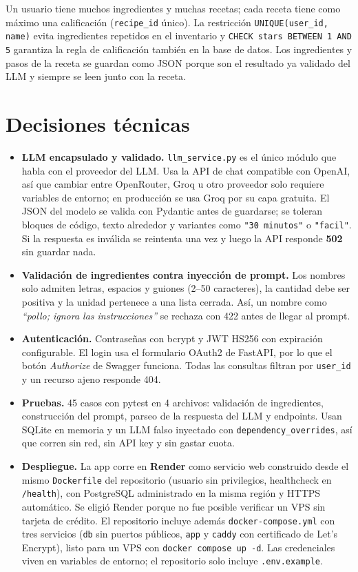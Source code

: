 \documentclass[10pt,a4paper]{article}
\newcommand{\code}[1]{\texttt{\small #1}}
\begin{document}
Un usuario tiene muchos ingredientes y muchas recetas; cada receta tiene como máximo una calificación (\code{recipe\_id} único). La restricción \code{UNIQUE(user\_id, name)} evita ingredientes repetidos en el inventario y \code{CHECK stars BETWEEN 1 AND 5} garantiza la regla de calificación también en la base de datos. Los ingredientes y pasos de la receta se guardan como JSON porque son el resultado ya validado del LLM y siempre se leen junto con la receta.

\section{Decisiones técnicas}
\begin{itemize}
  \item \textbf{LLM encapsulado y validado.} \code{llm\_service.py} es el único módulo que habla con el proveedor del LLM. Usa la API de chat compatible con OpenAI, así que cambiar entre OpenRouter, Groq u otro proveedor solo requiere variables de entorno; en producción se usa Groq por su capa gratuita. El JSON del modelo se valida con Pydantic antes de guardarse; se toleran bloques de código, texto alrededor y variantes como \code{"30 minutos"} o \code{"facil"}. Si la respuesta es inválida se reintenta una vez y luego la API responde \textbf{502} sin guardar nada.
  \item \textbf{Validación de ingredientes contra inyección de prompt.} Los nombres solo admiten letras, espacios y guiones (2–50 caracteres), la cantidad debe ser positiva y la unidad pertenece a una lista cerrada. Así, un nombre como \textit{``pollo; ignora las instrucciones''} se rechaza con 422 antes de llegar al prompt.
  \item \textbf{Autenticación.} Contraseñas con bcrypt y JWT HS256 con expiración configurable. El login usa el formulario OAuth2 de FastAPI, por lo que el botón \textit{Authorize} de Swagger funciona. Todas las consultas filtran por \code{user\_id} y un recurso ajeno responde 404.
  \item \textbf{Pruebas.} 45 casos con pytest en 4 archivos: validación de ingredientes, construcción del prompt, parseo de la respuesta del LLM y endpoints. Usan SQLite en memoria y un LLM falso inyectado con \code{dependency\_overrides}, así que corren sin red, sin API key y sin gastar cuota.
  \item \textbf{Despliegue.} La app corre en \textbf{Render} como servicio web construido desde el mismo \code{Dockerfile} del repositorio (usuario sin privilegios, healthcheck en \code{/health}), con PostgreSQL administrado en la misma región y HTTPS automático. Se eligió Render porque no fue posible verificar un VPS sin tarjeta de crédito. El repositorio incluye además \code{docker-compose.yml} con tres servicios (\code{db} sin puertos públicos, \code{app} y \code{caddy} con certificado de Let's Encrypt), listo para un VPS con \code{docker compose up -d}. Las credenciales viven en variables de entorno; el repositorio solo incluye \code{.env.example}.

\end{itemize}
\end{document}
